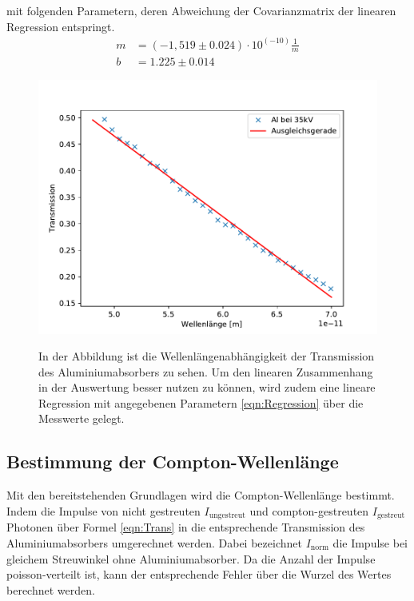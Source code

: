\documentclass[titlepage = firstcover]{scrartcl}
\begin{document}
        \noindent
        mit folgenden Parametern, deren Abweichung der Covarianzmatrix der linearen Regression entspringt.
        \begin{align}
            m &= (-1,519 \pm 0.024) \cdot 10^{(-10)} \frac{1}{m} \\
            b &= 1.225 \pm 0.014
            \label{eqn:Parameter}
        \end{align}
        \FloatBarrier
        \begin{figure}[h]
            \centering
            \caption{In der Abbildung ist die Wellenlängenabhängigkeit der Transmission des Aluminiumabsorbers zu sehen. Um den linearen Zusammenhang in der Auswertung besser nutzen zu können, wird zudem eine lineare Regression mit angegebenen Parametern \ref{eqn:Regression} über die Messwerte gelegt.}
            \includegraphics[width = 0.9\linewidth]{Compton_Alu.pdf}
            \label{fig:Transmission}
        \end{figure}
        \FloatBarrier

        \subsection{Bestimmung der Compton-Wellenlänge}
        Mit den bereitstehenden Grundlagen wird die Compton-Wellenlänge bestimmt. Indem die Impulse von nicht gestreuten $I_{\text{ungestreut}}$ 
        und compton-gestreuten $I_{\text{gestreut}}$ Photonen über Formel \ref{eqn:Trans} in die entsprechende Transmission des Aluminiumabsorbers umgerechnet
        werden. Dabei bezeichnet $I_{\text{norm}}$ die Impulse bei gleichem Streuwinkel ohne Aluminiumabsorber. Da die Anzahl der Impulse poisson-verteilt 
        ist, kann der entsprechende Fehler über die Wurzel des Wertes berechnet werden.
\end{document}
